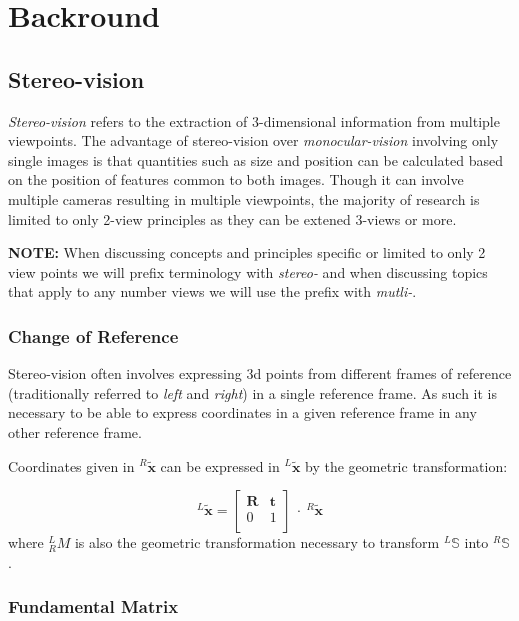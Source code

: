 \documentclass{report}
\newcommand{\rL}[0]{\ensuremath{^{L}_{R}}}
\newcommand{\hxL}[0]{\ensuremath{^{L}\tilde{\textbf{x}}}}
\newcommand{\hxR}[0]{\ensuremath{^{R}\tilde{\textbf{x}}}}
\begin{document}
\chapter{Backround}
\section{Stereo-vision}
\par \textit{Stereo-vision} refers to the extraction of 3-dimensional information from multiple viewpoints. The advantage of stereo-vision over \textit{monocular-vision} involving only single images is that quantities such as size and position can be calculated based on the position of features common to both images. Though it can involve multiple cameras resulting in multiple viewpoints, the majority of research is limited to only 2-view principles as they can be extened 3-views or more.
\par \textbf{NOTE:} When discussing concepts and principles specific or limited to only 2 view points we will prefix terminology with \textit{stereo-} and when discussing topics that apply to any number views we will use the prefix with \textit{mutli-}.

\subsection*{Change of Reference}
\par Stereo-vision often involves expressing 3d points from different frames of reference (traditionally referred to \textit{left} and \textit{right}) in a single reference frame. As such it is necessary to be able to express coordinates in a given reference frame in any other reference frame.
\par Coordinates given in $\hxR$ can be expressed in $\hxL$ by the geometric transformation:
\par
\begin{equation}
	\hxL = 
	\left[\begin{array}{c|c}
		\textbf{R} & \textbf{t} \\\hline
		0 & 1 \\
	\end{array}\right]
	\: \cdot\: \hxR
\end{equation}
where $\rL{M}$ is also the geometric transformation necessary to transform $^{L}\mathbb{S}$ into $^{R}\mathbb{S}$.
\subsection*{Fundamental Matrix}
\end{document}
